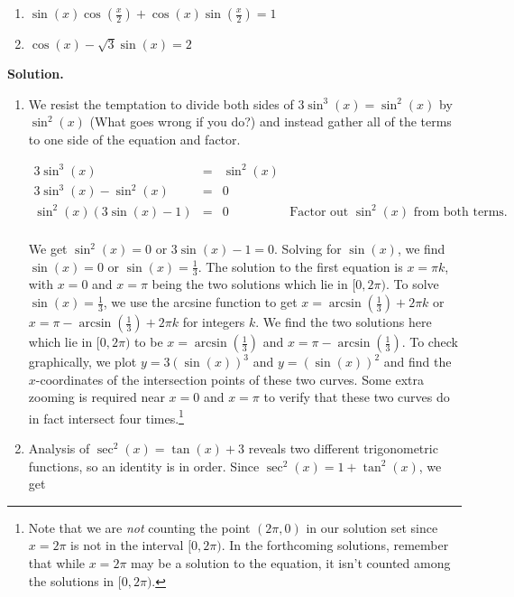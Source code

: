 \begin{ex}
\begin{multicols}{2}
\begin{enumerate}
\item  $\sin(x)\cos\left(\frac{x}{2}\right) + \cos(x)\sin\left(\frac{x}{2}\right) = 1$
\item  $\cos(x) - \sqrt{3} \sin(x) = 2$

\end{enumerate}
 
\end{multicols}

{\bf Solution.}

\begin{enumerate}

\item We resist the temptation to divide both sides of $3\sin^{3}(x) = \sin^{2}(x)$ by $\sin^{2}(x)$ (What goes wrong if you do?) and instead gather all of the terms to one side of the equation and factor.

\[ \begin{array}{rclr}

3\sin^{3}(x) & = &  \sin^{2}(x) & \\
3\sin^{3}(x) -  \sin^{2}(x) & = & 0 &  \\
\sin^{2}(x) (3 \sin(x) - 1) & = & 0 & \text{Factor out $\sin^{2}(x)$ from both terms.} \\ \end{array} \]

We get $\sin^{2}(x) = 0$ or $3\sin(x) - 1 = 0$. Solving for $\sin(x)$, we find  $\sin(x) = 0$ or $\sin(x) = \frac{1}{3}$.  The solution to the first equation is $x = \pi k$, with $x = 0$ and $x = \pi$ being the two solutions which lie in $[0,2\pi)$.  To solve $\sin(x) = \frac{1}{3}$, we use the arcsine function to get $x = \arcsin\left(\frac{1}{3}\right) + 2\pi k$ or $x = \pi - \arcsin\left(\frac{1}{3}\right) + 2\pi k$ for integers $k$. We find the two solutions here which lie in $[0,2\pi)$ to be $x = \arcsin\left(\frac{1}{3}\right)$ and $x = \pi - \arcsin\left(\frac{1}{3}\right)$.  To check graphically, we plot $y = 3(\sin(x))^3$ and $y = (\sin(x))^2$ and find the  $x$-coordinates of the intersection points of these two curves.  Some extra zooming is required near $x=0$ and $x=\pi$ to verify that these two curves do in fact intersect four times.\footnote{Note that we are \textit{not} counting the point $(2\pi,0)$ in our solution set since $x = 2\pi$ is not in the interval $[0,2\pi)$. In the forthcoming solutions, remember that while  $x = 2\pi$ may be a solution to the equation, it isn't counted among the solutions in $[0,2\pi)$.}

\item  Analysis of  $\sec^{2}(x) = \tan(x) + 3$ reveals two different trigonometric functions, so an identity is in order.  Since $\sec^{2}(x) = 1 + \tan^{2}(x)$, we get


\end{enumerate}
\end{ex}
